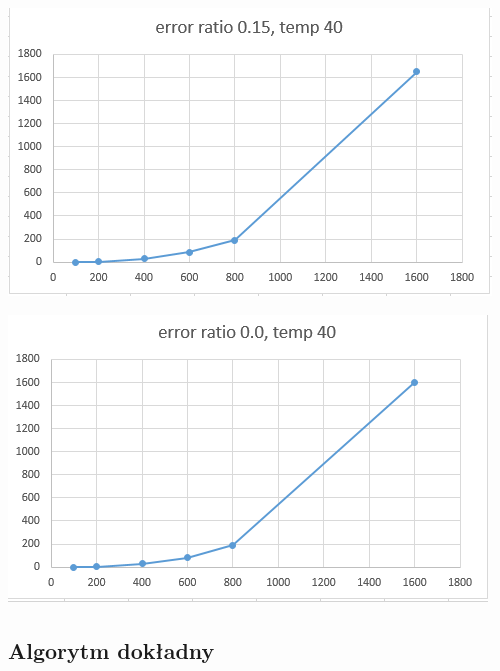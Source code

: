 \documentclass{article}
\begin{document}
\includegraphics{temp40err015time}

\includegraphics{temp40err000time}

\subsection{Algorytm dokładny}
\end{document}
